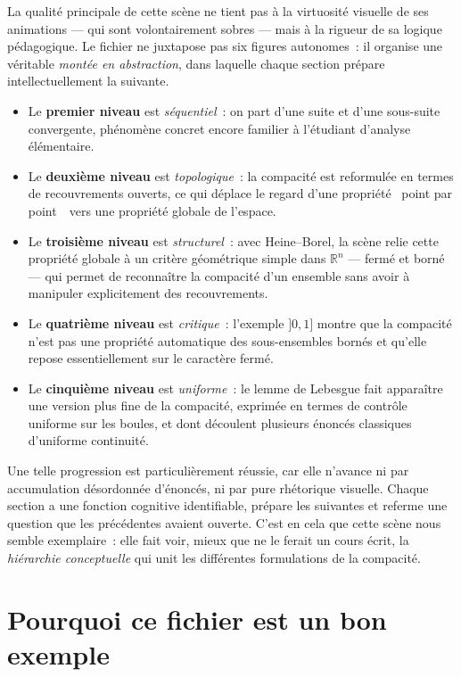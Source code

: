 \documentclass[12pt, a4paper, openany]{report}
\begin{document}
	La qualité principale de cette scène ne tient pas à la virtuosité visuelle de ses animations — qui sont volontairement sobres — mais à la rigueur de sa logique pédagogique. Le fichier ne juxtapose pas six figures autonomes~: il organise une véritable \emph{montée en abstraction}, dans laquelle chaque section prépare intellectuellement la suivante.

	\begin{itemize}
		\item Le \textbf{premier niveau} est \emph{séquentiel}~: on part d’une suite et d’une sous-suite convergente, phénomène concret encore familier à l’étudiant d’analyse élémentaire.
		\item Le \textbf{deuxième niveau} est \emph{topologique}~: la compacité est reformulée en termes de recouvrements ouverts, ce qui déplace le regard d’une propriété \og~point par point~\fg\ vers une propriété globale de l’espace.
		\item Le \textbf{troisième niveau} est \emph{structurel}~: avec Heine--Borel, la scène relie cette propriété globale à un critère géométrique simple dans $\mathbb{R}^n$ — fermé et borné — qui permet de reconnaître la compacité d’un ensemble sans avoir à manipuler explicitement des recouvrements.
		\item Le \textbf{quatrième niveau} est \emph{critique}~: l’exemple $]0,1]$ montre que la compacité n’est pas une propriété automatique des sous-ensembles bornés et qu’elle repose essentiellement sur le caractère fermé.
		\item Le \textbf{cinquième niveau} est \emph{uniforme}~: le lemme de Lebesgue fait apparaître une version plus fine de la compacité, exprimée en termes de contrôle uniforme sur les boules, et dont découlent plusieurs énoncés classiques d’uniforme continuité.
	\end{itemize}

	Une telle progression est particulièrement réussie, car elle n’avance ni par accumulation désordonnée d’énoncés, ni par pure rhétorique visuelle. Chaque section a une fonction cognitive identifiable, prépare les suivantes et referme une question que les précédentes avaient ouverte. C’est en cela que cette scène nous semble exemplaire~: elle fait voir, mieux que ne le ferait un cours écrit, la \emph{hiérarchie conceptuelle} qui unit les différentes formulations de la compacité.

	\section{Pourquoi ce fichier est un bon exemple}
\end{document}
